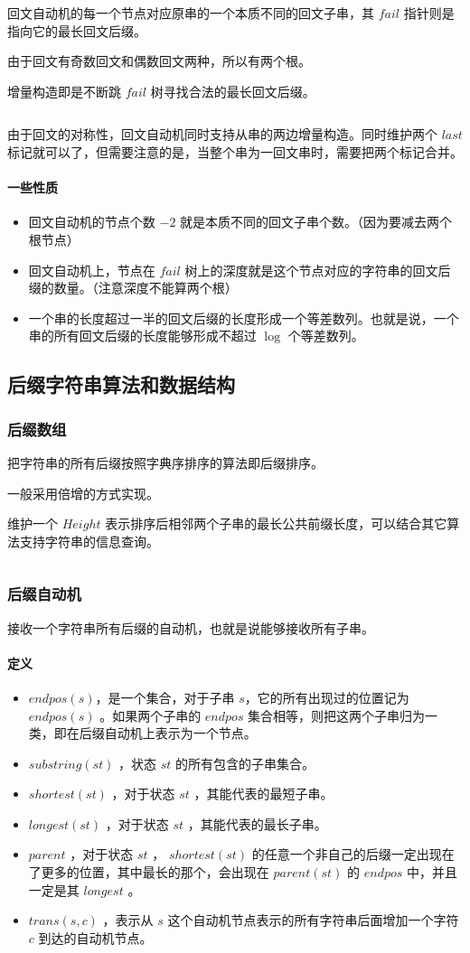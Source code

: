 \documentclass[UTF-8]{ctexart}
\newcommand{\cpp}[1]{\inputminted[bgcolor=bg,breaklines,breakanywhere=true]{c++}{#1}}
\begin{document}
			回文自动机的每一个节点对应原串的一个本质不同的回文子串，其 $fail$ 指针则是指向它的最长回文后缀。
			
			由于回文有奇数回文和偶数回文两种，所以有两个根。
			
			增量构造即是不断跳 $fail$ 树寻找合法的最长回文后缀。
			\cpp{code//String//pam.cpp}
			由于回文的对称性，回文自动机同时支持从串的两边增量构造。同时维护两个 $last$ 标记就可以了，但需要注意的是，当整个串为一回文串时，需要把两个标记合并。
			\paragraph{一些性质}
			\begin{itemize}
				\item 回文自动机的节点个数 $-2$ 就是本质不同的回文子串个数。（因为要减去两个根节点）
				\item 回文自动机上，节点在 $fail$ 树上的深度就是这个节点对应的字符串的回文后缀的数量。（注意深度不能算两个根）
				\item 一个串的长度超过一半的回文后缀的长度形成一个等差数列。也就是说，一个串的所有回文后缀的长度能够形成不超过 $\log$ 个等差数列。
			\end{itemize}
		\subsection{后缀字符串算法和数据结构}
			\subsubsection{后缀数组}
			把字符串的所有后缀按照字典序排序的算法即后缀排序。
			
			一般采用倍增的方式实现。
			
			维护一个 $Height$ 表示排序后相邻两个子串的最长公共前缀长度，可以结合其它算法支持字符串的信息查询。
			\cpp{code//String//sa.cpp}
			\subsubsection{后缀自动机}
			接收一个字符串所有后缀的自动机，也就是说能够接收所有子串。
			\paragraph{定义}
			\begin{itemize}
				\item $endpos(s)$，是一个集合，对于子串 $s$，它的所有出现过的位置记为 $endpos(s)$ 。如果两个子串的 $endpos$ 集合相等，则把这两个子串归为一类，即在后缀自动机上表示为一个节点。  
				\item  $substring(st)$ ，状态 $st$ 的所有包含的子串集合。
				\item  $shortest(st)$ ，对于状态 $st$ ，其能代表的最短子串。  
				\item  $longest(st)$ ，对于状态 $st$ ，其能代表的最长子串。  
				\item  $parent$ ，对于状态 $st$ ， $shortest(st)$ 的任意一个非自己的后缀一定出现在了更多的位置，其中最长的那个，会出现在 $parent(st)$ 的 $endpos$ 中，并且一定是其 $longest$ 。
				\item  $trans(s,c)$ ，表示从 $s$ 这个自动机节点表示的所有字符串后面增加一个字符 $c$ 到达的自动机节点。
			\end{itemize}
\end{document}
